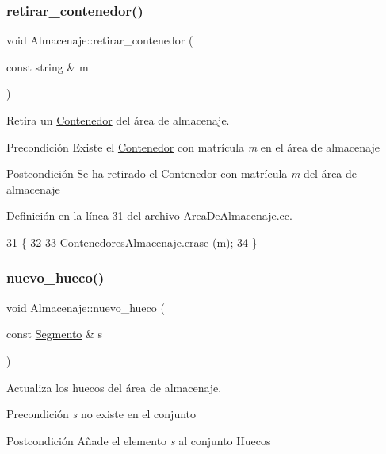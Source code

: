 \subsubsection{\texorpdfstring{retirar\+\_\+contenedor()}{retirar\_contenedor()}}
{\footnotesize\ttfamily void Almacenaje\+::retirar\+\_\+contenedor (\begin{DoxyParamCaption}\item[{const string \&}]{m }\end{DoxyParamCaption})}



Retira un \hyperlink{class_contenedor}{Contenedor} del área de almacenaje. 

\begin{DoxyPrecond}{Precondición}
Existe el \hyperlink{class_contenedor}{Contenedor} con matrícula {\itshape m} en el área de almacenaje 
\end{DoxyPrecond}
\begin{DoxyPostcond}{Postcondición}
Se ha retirado el \hyperlink{class_contenedor}{Contenedor} con matrícula {\itshape m} del área de almacenaje 
\end{DoxyPostcond}


Definición en la línea 31 del archivo Area\+De\+Almacenaje.\+cc.


\begin{DoxyCode}
31                                                     \{
32     
33     \hyperlink{class_almacenaje_ab3cfe0feaf244094a7e2c5225ee681e6}{ContenedoresAlmacenaje}.erase (m);
34 \}
\end{DoxyCode}
\mbox{\label{class_almacenaje_ac98f7d262897f33ece29a432e111f02c}} 
\subsubsection{\texorpdfstring{nuevo\+\_\+hueco()}{nuevo\_hueco()}}
{\footnotesize\ttfamily void Almacenaje\+::nuevo\+\_\+hueco (\begin{DoxyParamCaption}\item[{const \hyperlink{class_segmento}{Segmento} \&}]{s }\end{DoxyParamCaption})}



Actualiza los huecos del área de almacenaje. 

\begin{DoxyPrecond}{Precondición}
{\itshape s} no existe en el conjunto 
\end{DoxyPrecond}
\begin{DoxyPostcond}{Postcondición}
Añade el elemento {\itshape s} al conjunto Huecos 
\end{DoxyPostcond}


